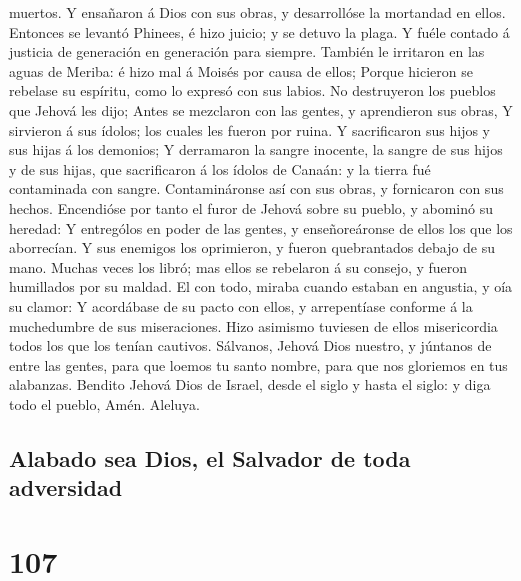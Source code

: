 muertos.  Y ensañaron á Dios con sus obras, y
desarrollóse la mortandad en ellos.  Entonces se levantó
Phinees, é hizo juicio; y se detuvo la plaga.  Y fuéle
contado á justicia de generación en generación para siempre.
 También le irritaron en las aguas de Meriba: é hizo mal
á Moisés por causa de ellos;  Porque hicieron se rebelase
su espíritu, como lo expresó con sus labios.  No
destruyeron los pueblos que Jehová les dijo;  Antes se
mezclaron con las gentes, y aprendieron sus obras,  Y
sirvieron á sus ídolos; los cuales les fueron por ruina. 
Y sacrificaron sus hijos y sus hijas á los demonios;  Y
derramaron la sangre inocente, la sangre de sus hijos y de sus hijas,
que sacrificaron á los ídolos de Canaán: y la tierra fué contaminada con
sangre.  Contamináronse así con sus obras, y fornicaron
con sus hechos.  Encendióse por tanto el furor de Jehová
sobre su pueblo, y abominó su heredad:  Y entrególos en
poder de las gentes, y enseñoreáronse de ellos los que los aborrecían.
 Y sus enemigos los oprimieron, y fueron quebrantados
debajo de su mano.  Muchas veces los libró; mas ellos se
rebelaron á su consejo, y fueron humillados por su maldad.
 El con todo, miraba cuando estaban en angustia, y oía su
clamor:  Y acordábase de su pacto con ellos, y
arrepentíase conforme á la muchedumbre de sus miseraciones.
 Hizo asimismo tuviesen de ellos misericordia todos los
que los tenían cautivos.  Sálvanos, Jehová Dios nuestro,
y júntanos de entre las gentes, para que loemos tu santo nombre, para
que nos gloriemos en tus alabanzas.  Bendito Jehová Dios
de Israel, desde el siglo y hasta el siglo: y diga todo el pueblo, Amén.
Aleluya.

\hypertarget{alabado-sea-dios-el-salvador-de-toda-adversidad}{%
\subsection{Alabado sea Dios, el Salvador de toda
adversidad}\label{alabado-sea-dios-el-salvador-de-toda-adversidad}}

\hypertarget{section-106}{%
\section{107}\label{section-106}}

